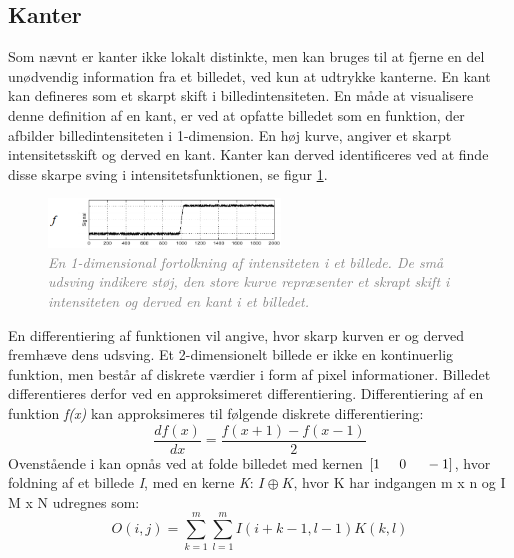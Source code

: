 \subsection{Kanter}\label{subsec:kant}
Som nævnt er kanter ikke lokalt distinkte, men kan bruges til at fjerne en del unødvendig information fra et billedet, ved kun at udtrykke kanterne.  En kant kan defineres som et skarpt skift i billedintensiteten. 
En måde at visualisere denne definition af en kant, er ved at opfatte billedet som en funktion, der afbilder billedintensiteten i 1-dimension. En høj kurve, angiver et skarpt intensitetsskift og derved en kant. Kanter kan derved identificeres ved at finde disse skarpe sving i intensitetsfunktionen, se figur \ref{fig:kant}.
\noindent
\begin{figure}[H]
    \centering
    \includegraphics[width=0.55\textwidth]{fig/7.png}
     \vspace{-1em}
    \begin{center}        
     \caption{\textcolor{gray}{\footnotesize \textit{
     En 1-dimensional fortolkning af intensiteten i et billede. De små udsving indikere støj, den store kurve repræsenter et skrapt skift i intensiteten og derved en kant i et billedet.}}}
    \label{fig:kant}
     \end{center}
       \vspace{-2.5em}
  \end{figure}
\noindent
En differentiering af funktionen vil angive, hvor skarp kurven er og derved fremhæve dens udsving. Et 2-dimensionelt billede er ikke en kontinuerlig funktion, men består af diskrete værdier i form af pixel informationer.
Billedet differentieres derfor ved en approksimeret differentiering. Differentiering af en funktion \emph{f(x)} kan approksimeres til følgende diskrete differentiering:
\begin{equation}
\dfrac{df(x)}{dx}=\dfrac{f(x+1)-f(x-1)}{2}
\label{diff}
\end{equation}
Ovenstående i kan opnås ved at folde billedet med kernen $[1 \hspace{0.5cm} 0 \hspace{0.5cm} -1]$, hvor foldning af et billede \emph{I}, med en kerne \emph{K}: $I\oplus K$, hvor K har indgangen m x n og I M x N udregnes som:
\begin{equation}
O(i,j) = \sum\limits_{k=1}^m \sum\limits_{l=1}^m I(i+k-1,l-1)K(k,l)
\end{equation}
